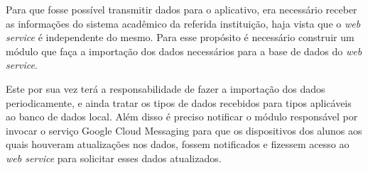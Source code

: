 	\pagebreak
		
		

	\par Para que fosse possível transmitir dados para o aplicativo, era
necessário receber as informações do sistema acadêmico da referida instituição,
haja vista que o \textit{web service} é independente do mesmo. Para esse
propósito é necessário  construir um módulo que faça a importação dos dados
necessários para a base de dados do \textit{web service}. 

	\par Este por sua vez terá a responsabilidade de fazer a importação dos dados
periodicamente, e ainda tratar os tipos de dados recebidos para tipos
aplicáveis ao banco de dados local. Além disso é preciso notificar o módulo
responsável por invocar o serviço Google Cloud Messaging para que os
dispositivos dos alunos aos quais houveram atualizações nos dados, fossem
notificados e fizessem acesso ao \textit{web service} para solicitar esses
dados atualizados.

